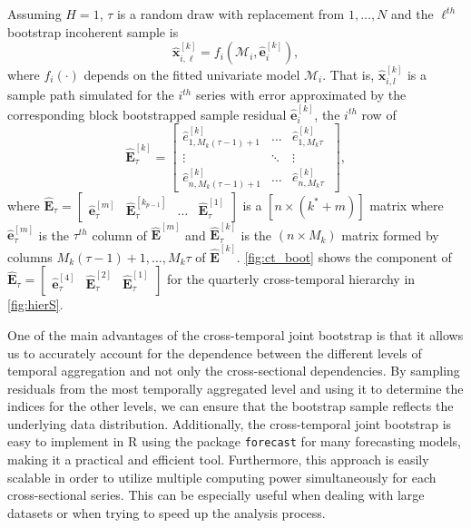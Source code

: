 \documentclass[a4paper,11pt]{article}
\newcommand{\evet}{\bm{e}}
\newcommand{\xvet}{\bm{x}}
\newcommand{\Evet}{\bm{E}}
\theoremstyle{definition}
\begin{document}
Assuming $H = 1$, $\tau$ is a random draw with replacement from $1,\dots, N$ and the $\ell^{th}$ bootstrap incoherent sample is
$$
	\widehat{\xvet}_{i,\ell}^{[k]} = f_i(\mathcal{M}_i, \widehat{\evet}_{i}^{[k]}),
$$
where $f_i(\cdot)$ depends on the fitted univariate model $\mathcal{M}_i$. That is, $\widehat{\xvet}_{i,l}^{[k]}$ is a sample path simulated for the $i^{th}$ series with error approximated by the corresponding block bootstrapped sample residual $\widehat{\evet}_{i}^{[k]}$, the $i^{th}$ row of
$$
	\widehat{\Evet}^{[k]}_{\tau} = \begin{bmatrix}
		\widehat{e}^{[k]}_{1,M_k(\tau-1)+1} & \dots  & \widehat{e}^{[k]}_{1,M_k\tau}   \\
		\vdots                              & \ddots & \vdots                          \\
		\widehat{e}^{[k]}_{n,M_k(\tau-1)+1} & \dots  & \widehat{e}^{[k]}_{n,M_k\tau} \
	\end{bmatrix},
$$
where $\widehat{\Evet}_{\tau} = \begin{bmatrix}
		\widehat{\evet}^{[m]}_\tau & \widehat{\Evet}^{[k_{p-1}]}_{\tau} & \dots & \widehat{\Evet}^{[1]}_{\tau}
	\end{bmatrix}$ is a $[n \times (k^\ast + m)]$ matrix where $\widehat{\evet}^{[m]}_\tau$ is the $\tau^{th}$ column of $\widehat{\Evet}^{[m]}$ and $\widehat{\Evet}^{[k]}_{\tau}$ is the $(n \times M_k)$ matrix formed by columns $M_k(\tau-1)+1,\dots, M_k \tau$ of $\widehat{\Evet}^{[k]}$. 	\autoref{fig:ct_boot} shows the component of $\widehat{\Evet}_{\tau} = \begin{bmatrix}
		\widehat{\evet}^{[4]}_\tau & \widehat{\Evet}^{[2]}_{\tau} & \widehat{\Evet}^{[1]}_{\tau}
	\end{bmatrix}$ for the quarterly cross-temporal hierarchy in \autoref{fig:hierS}.

One of the main advantages of the cross-temporal joint bootstrap is that it allows us to accurately account for the dependence between the different levels of temporal aggregation and not only the cross-sectional dependencies. By sampling residuals from the most temporally aggregated level and using it to determine the indices for the other levels, we can ensure that the bootstrap sample reflects the underlying data distribution. Additionally, the cross-temporal joint bootstrap is easy to implement in R \citep{rcoreteam2022} using the package \texttt{forecast} \citep{Rforecast} for many forecasting models, making it a practical and efficient tool. Furthermore, this approach is easily scalable in order to utilize multiple computing power simultaneously for each cross-sectional series. This can be especially useful when dealing with large datasets or when trying to speed up the analysis process.
\end{document}
